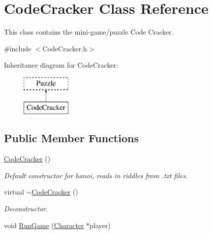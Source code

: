 \hypertarget{classCodeCracker}{\section{Code\-Cracker Class Reference}
\label{classCodeCracker}
}


This class contains the mini-\/game/puzzle Code Cracker.  




{\ttfamily \#include $<$Code\-Cracker.\-h$>$}

Inheritance diagram for Code\-Cracker\-:\begin{figure}[H]
\begin{center}
\leavevmode
\includegraphics[height=2.000000cm]{classCodeCracker}
\end{center}
\end{figure}
\subsection*{Public Member Functions}
\begin{DoxyCompactItemize}
\item 
\hyperlink{classCodeCracker_a46b5ec438efd38104b9a406b45c8cd68}{Code\-Cracker} ()
\begin{DoxyCompactList}\small\item\em Default constructor for hanoi, reads in riddles from .txt files. \end{DoxyCompactList}\item 
virtual \hyperlink{classCodeCracker_ae7dc389e166286ca2271625154dde39c}{$\sim$\-Code\-Cracker} ()
\begin{DoxyCompactList}\small\item\em Deconstructor. \end{DoxyCompactList}\item 
void \hyperlink{classCodeCracker_a663fb6edb8141efd3b1760e46ea9f4e9}{Run\-Game} (\hyperlink{classCharacter}{Character} $\ast$player)
\end{DoxyCompactItemize}
